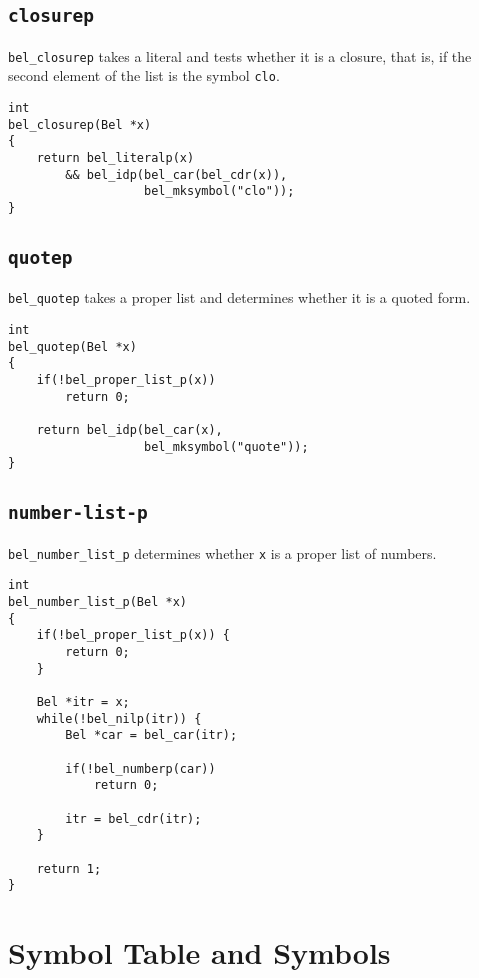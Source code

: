 \documentclass[openright,a4paper,twoside,12pt]{memoir}
\begin{document}
\subsection{\texttt{closurep}}
\label{sec:org6cb411e}

\texttt{bel\_closurep} takes a literal and tests whether it is a closure, that
is, if the second element of the list is the symbol \texttt{clo}.

\begin{verbatim}
int
bel_closurep(Bel *x)
{
    return bel_literalp(x)
        && bel_idp(bel_car(bel_cdr(x)),
                   bel_mksymbol("clo"));
}
\end{verbatim}

\subsection{\texttt{quotep}}
\label{sec:org830bc90}

\texttt{bel\_quotep} takes a proper list and determines whether it is a quoted
form.

\begin{verbatim}
int
bel_quotep(Bel *x)
{
    if(!bel_proper_list_p(x))
        return 0;

    return bel_idp(bel_car(x),
                   bel_mksymbol("quote"));
}
\end{verbatim}

\subsection{\texttt{number-list-p}}
\label{sec:org1b09c69}

\texttt{bel\_number\_list\_p} determines whether \texttt{x} is a proper list of numbers.

\begin{verbatim}
int
bel_number_list_p(Bel *x)
{
    if(!bel_proper_list_p(x)) {
        return 0;
    }

    Bel *itr = x;
    while(!bel_nilp(itr)) {
        Bel *car = bel_car(itr);

        if(!bel_numberp(car))
            return 0;

        itr = bel_cdr(itr);
    }

    return 1;
}
\end{verbatim}

\section{Symbol Table and Symbols}
\label{sec:orgc2d2914}
\end{document}

